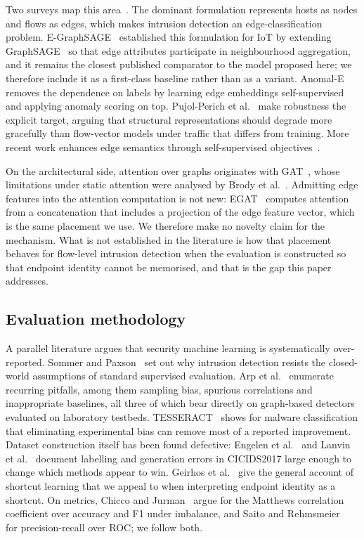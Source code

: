 Two surveys map this area~\cite{bilot2024survey,gnnids2026survey}. The
dominant formulation represents hosts as nodes and flows as edges, which makes
intrusion detection an edge-classification problem.
E-GraphSAGE~\cite{lo2022egraphsage} established this formulation for IoT by
extending GraphSAGE~\cite{hamilton2017graphsage} so that edge attributes
participate in neighbourhood aggregation, and it remains the closest published
comparator to the model proposed here; we therefore include it as a
first-class baseline rather than as a variant.
Anomal-E~\cite{caville2022anomale} removes the dependence on labels by
learning edge embeddings self-supervised and applying anomaly scoring on top.
Pujol-Perich et al.~\cite{pujolperich2022unveiling} make robustness the
explicit target, arguing that structural representations should degrade more
gracefully than flow-vector models under traffic that differs from training.
More recent work enhances edge semantics through self-supervised
objectives~\cite{semantic2026edge}.

On the architectural side, attention over graphs originates with
GAT~\cite{velickovic2018gat}, whose limitations under static attention were
analysed by Brody et al.~\cite{brody2022gatv2}. Admitting edge features into
the attention computation is not new: EGAT~\cite{chen2021egat} computes
attention from a concatenation that includes a projection of the edge feature
vector, which is the same placement we use. We therefore make no novelty claim
for the mechanism. What is not established in the literature is how that
placement behaves for flow-level intrusion detection when the evaluation is
constructed so that endpoint identity cannot be memorised, and that is the gap
this paper addresses.

\subsection{Evaluation methodology}

A parallel literature argues that security machine learning is systematically
over-reported. Sommer and Paxson~\cite{sommer2010outside} set out why intrusion
detection resists the closed-world assumptions of standard supervised
evaluation. Arp et al.~\cite{arp2024pitfalls} enumerate recurring pitfalls,
among them sampling bias, spurious correlations and inappropriate baselines,
all three of which bear directly on graph-based detectors evaluated on
laboratory testbeds. TESSERACT~\cite{pendlebury2019tesseract} shows for malware
classification that eliminating experimental bias can remove most of a reported
improvement. Dataset construction itself has been found defective:
Engelen et al.~\cite{engelen2021troubleshooting} and
Lanvin et al.~\cite{lanvin2022errors} document labelling and generation errors
in CICIDS2017 large enough to change which methods appear to win.
Geirhos et al.~\cite{geirhos2020shortcut} give the general account of shortcut
learning that we appeal to when interpreting endpoint identity as a shortcut.
On metrics, Chicco and Jurman~\cite{chicco2020mcc} argue for the Matthews
correlation coefficient over accuracy and F1 under imbalance, and
Saito and Rehmsmeier~\cite{saito2015prcurve} for precision-recall over ROC;
we follow both.

